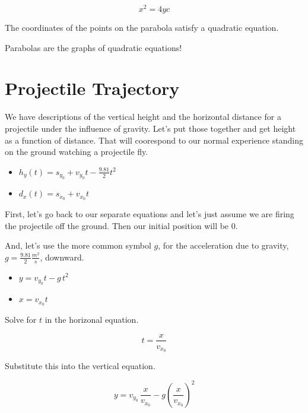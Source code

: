 \documentclass{ximera}
\begin{document}
\[  x^2   =  4 y c    \]


The coordinates of the points on the parabola satisfy a quadratic equation.  


\begin{center}
Parabolas are the graphs of quadratic equations!
\end{center}











\section{Projectile Trajectory}


We have descriptions of the vertical height and the horizontal distance for a projectile under the influence of gravity.  Let's put those together and get height as a function of distance.  That will coorespond to our normal experience standing on the ground watching a projectile fly.


\begin{itemize}
\item $h_y(t) = s_{y_0} + v_{y_0} t - \frac{9.81}{2} t^2$


\item $d_x(t) = s_{x_0} + v_{x_0} t$
\end{itemize}




First, let's go back to our separate equations and let's just assume we are firing the projectile off the ground.  Then our initial position will be $0$.  

And, let's use the more common symbol $g$, for the acceleration due to gravity, $g = \frac{9.81}{2} \frac{m^2}{s}$, downward.




\begin{itemize}
\item $y = v_{y_0} t - g \, t^2$


\item $x = v_{x_0} t$
\end{itemize}


Solve for $t$ in the horizonal equation.


\[ t = \frac{x}{v_{x_0}} \]

Substitute this into the vertical equation.


\[  y = v_{y_0} \, \frac{x}{v_{x_0}} - g \left(\frac{x}{v_{x_0}}\right)^2  \]
\end{document}
